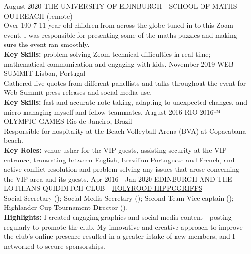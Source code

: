 \documentclass[]{cv-style}          %
\begin{document}
\begin{entrylist}
\entry
  {August 2020}
  {THE UNIVERSITY OF EDINBURGH - SCHOOL OF MATHS OUTREACH}
  {(remote)}
  {\\
  Over 100 7-11 year old children from across the globe tuned in to this Zoom event. I was responsible for presenting some of the maths puzzles and making sure the event ran smoothly.\\
  \textbf{Key Skills:} problem-solving Zoom technical difficulties in real-time; mathematical communication and engaging with kids.} 
\entry
  {November 2019}
  {WEB SUMMIT}
  {Lisbon, Portugal}
  {\\
  Gathered live quotes from different panellists and talks throughout the event for Web Summit press releases and social media use.\\
  \textbf{Key Skills:} fast and accurate note-taking, adapting to unexpected changes, and micro-managing myself and fellow teammates.} 
\entry
  {August 2016}
  {RIO 2016™ OLYMPIC GAMES}
  {Rio de Janeiro, Brazil}
  {\\
  Responsible for hospitality at the Beach Volleyball Arena (BVA) at Copacabana beach.\\ \textbf{Key Roles:} venue usher for the VIP guests, assisting security at the VIP entrance, translating between English, Brazilian Portuguese and French, and active conflict resolution and problem solving any issues that arose concerning the VIP area and its guests.}
\entry
  {Apr 2016 - Jan 2020}
  {EDINBURGH AND THE LOTHIANS QUIDDITCH CLUB - \href{https://holyroodhippogriffs.co.uk}{HOLYROOD HIPPOGRIFFS}}
  {}
  { \\
  Social Secretary ();
  Social Media Secretary ();
  Second Team Vice-captain ();
  Highlander Cup Tournament Director (). \\
  \textbf{Highlights:} I created engaging graphics and social media content - posting regularly to promote the club. My innovative and creative approach to improve the club's online presence resulted in a greater intake of new members, and I networked to secure sponsorships.}
\end{entrylist}
\end{document}
